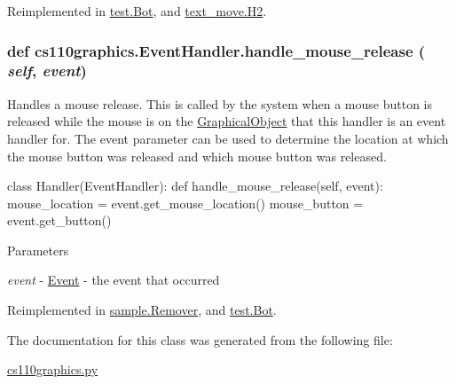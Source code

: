 Reimplemented in \hyperlink{classtest_1_1Bot_a970422a4391cc2b9ff89a2e42063bb6e}{test.Bot}, and \hyperlink{classtext__move_1_1H2_a13611a7fe23eefc92b40ff3874e026bd}{text\_\-move.H2}.\hypertarget{classcs110graphics_1_1EventHandler_a320a7dbf68d37e0101b237bff1713088}{
\subsubsection[{handle\_\-mouse\_\-release}]{\setlength{\rightskip}{0pt plus 5cm}def cs110graphics.EventHandler.handle\_\-mouse\_\-release ( {\em self}, \/   {\em event})}}
\label{classcs110graphics_1_1EventHandler_a320a7dbf68d37e0101b237bff1713088}


Handles a mouse release. This is called by the system when a mouse button is released while the mouse is on the \hyperlink{classcs110graphics_1_1GraphicalObject}{GraphicalObject} that this handler is an event handler for. The event parameter can be used to determine the location at which the mouse button was released and which mouse button was released. 
\begin{DoxyCode}
 class Handler(EventHandler):
     def handle_mouse_release(self, event):
         mouse_location = event.get_mouse_location()
         mouse_button = event.get_button()
\end{DoxyCode}
 
\begin{DoxyParams}{Parameters}
\item[{\em event}]-\/ \hyperlink{classcs110graphics_1_1Event}{Event} -\/ the event that occurred \end{DoxyParams}


Reimplemented in \hyperlink{classsample_1_1Remover_a84484de500f08402e582c126432e0cf1}{sample.Remover}, and \hyperlink{classtest_1_1Bot_a18fc05b6e2c1e42e1b6c639f4844a059}{test.Bot}.

The documentation for this class was generated from the following file:\begin{DoxyCompactItemize}
\item 
\hyperlink{cs110graphics_8py}{cs110graphics.py}\end{DoxyCompactItemize}
